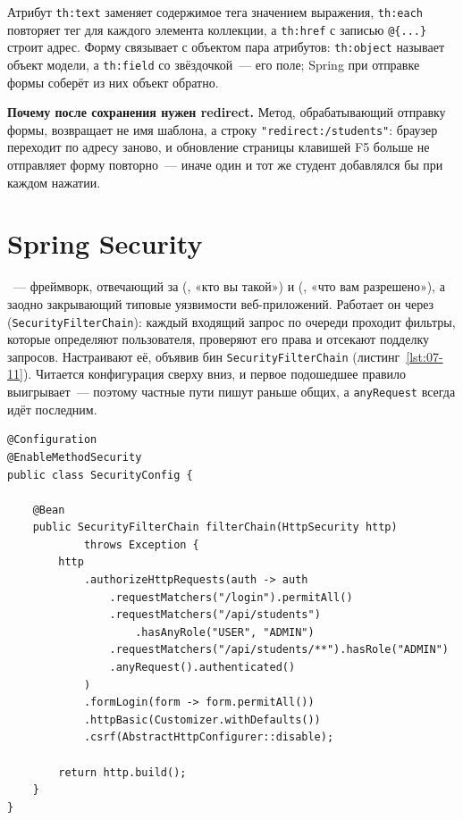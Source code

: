 Атрибут \texttt{th:text} заменяет содержимое тега значением выражения,
\texttt{th:each} повторяет тег для каждого элемента коллекции, а
\texttt{th:href} с записью \texttt{@\{...\}} строит адрес. Форму связывает с
объектом пара атрибутов: \texttt{th:object} называет объект модели, а
\texttt{th:field} со звёздочкой~--- его поле; Spring при отправке формы соберёт
из них объект обратно.

\begin{vrezka}
\textbf{Почему после сохранения нужен redirect.} Метод, обрабатывающий
отправку формы, возвращает не имя шаблона, а строку
\texttt{"redirect:/students"}: браузер переходит по адресу заново, и
обновление страницы клавишей F5 больше не отправляет форму повторно~---
иначе один и тот же студент добавлялся бы при каждом нажатии.
\end{vrezka}

\section{Spring Security}

~--- фреймворк, отвечающий за 
(, «кто вы такой») и 
(, «что вам разрешено»), а заодно закрывающий типовые
уязвимости веб-приложений. Работает он через 
(\texttt{SecurityFilterChain}): каждый входящий запрос по очереди проходит
фильтры, которые определяют пользователя, проверяют его права и отсекают
подделку запросов. Настраивают её, объявив бин
\texttt{SecurityFilterChain} (листинг~\ref{lst:07-11}). Читается конфигурация
сверху вниз, и первое подошедшее правило выигрывает~--- поэтому частные пути
пишут раньше общих, а \texttt{anyRequest} всегда идёт последним.

\begin{listing}[H]
\begin{verbatim}
@Configuration
@EnableMethodSecurity
public class SecurityConfig {

    @Bean
    public SecurityFilterChain filterChain(HttpSecurity http)
            throws Exception {
        http
            .authorizeHttpRequests(auth -> auth
                .requestMatchers("/login").permitAll()
                .requestMatchers("/api/students")
                    .hasAnyRole("USER", "ADMIN")
                .requestMatchers("/api/students/**").hasRole("ADMIN")
                .anyRequest().authenticated()
            )
            .formLogin(form -> form.permitAll())
            .httpBasic(Customizer.withDefaults())
            .csrf(AbstractHttpConfigurer::disable);

        return http.build();
    }
}
\end{verbatim}
\caption{Конфигурация Spring Security}
\label{lst:07-11}
\end{listing}

